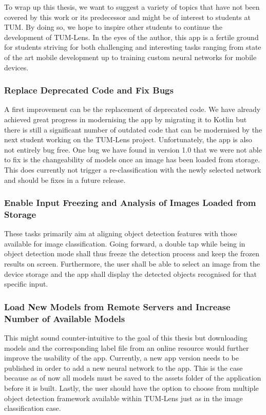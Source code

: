 \documentclass[
			   fontsize=11pt,
               paper=a4,
               bibliography=totoc,
               idxtotoc,
               headsepline,
               footsepline,
               footinclude=false,
               BCOR=12mm,
               DIV=13,
               openany,   %
               ]
               {scrbook}
\begin{document}
To wrap up this thesis, we want to suggest a variety of topics that have not been covered by this work or its predecessor and might be of interest to students at TUM. By doing so, we hope to inspire other students to continue the development of TUM-Lens. In the eyes of the author, this app is a fertile ground for students striving for both challenging and interesting tasks ranging from state of the art mobile development up to training custom neural networks for mobile devices.

\subsubsection{Replace Deprecated Code and Fix Bugs}
A first improvement can be the replacement of deprecated code. We have already achieved great progress in modernising the app by migrating it to Kotlin but there is still a significant number of outdated code that can be modernised by the next student working on the TUM-Lens project. Unfortunately, the app is also not entirely bug free. One bug we have found in version 1.0 that we were not able to fix is the changeability of models once an image has been loaded from storage. This does currently not trigger a re-classification with the newly selected network and should be fixes in a future release.

\subsubsection{Enable Input Freezing and Analysis of Images Loaded from Storage}
These tasks primarily aim at aligning object detection features with those available for image classification. Going forward, a double tap while being in object detection mode shall thus freeze the detection process and keep the frozen results on screen. Furthermore, the user shall be able to select an image from the device storage and the app shall display the detected objects recognised for that specific input.

\subsubsection{Load New Models from Remote Servers and Increase Number of Available Models}
This might sound counter-intuitive to the goal of this thesis but downloading models and the corresponding label file from an online resource would further improve the usability of the app. Currently, a new app version needs to be published in order to add a new neural network to the app. This is the case because as of now all models must be saved to the assets folder of the application before it is built. Lastly, the user should have the option to choose from multiple object detection framework available within TUM-Lens just as in the image classification case.
\end{document}
